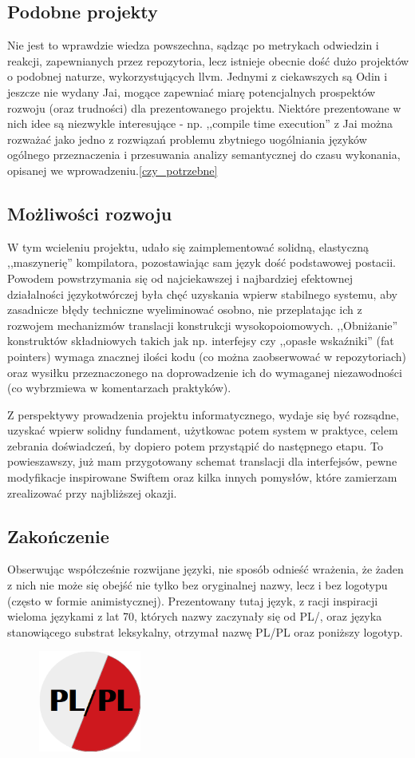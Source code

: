 \subsection{Podobne projekty}
Nie jest to wprawdzie wiedza powszechna, sądząc po metrykach odwiedzin i reakcji, zapewnianych przez repozytoria, lecz istnieje obecnie dość dużo projektów o podobnej naturze, wykorzystujących llvm. Jednymi z ciekawszych są Odin\cite{Odin} i jeszcze nie wydany Jai\cite{Jai}, mogące zapewniać miarę potencjalnych prospektów rozwoju (oraz trudności) dla prezentowanego projektu. Niektóre prezentowane w nich idee są niezwykle interesujące - np. ,,compile time execution'' z Jai można rozważać jako jedno z rozwiązań problemu zbytniego uogólniania języków ogólnego przeznaczenia i przesuwania analizy semantycznej do czasu wykonania, opisanej we wprowadzeniu.\ref{czy_potrzebne}

\subsection{Możliwości rozwoju}
W tym wcieleniu projektu, udało się zaimplementować solidną, elastyczną ,,maszynerię'' kompilatora, pozostawiając sam język dość podstawowej postacii. Powodem powstrzymania się od najciekawszej i najbardziej efektownej działalności językotwórczej była chęć uzyskania wpierw stabilnego systemu, aby zasadnicze błędy techniczne wyeliminować osobno, nie przeplatając ich z rozwojem mechanizmów translacji konstrukcji wysokopoiomowych. ,,Obniżanie'' konstruktów składniowych takich jak np. interfejsy czy ,,opasłe wskaźniki'' (fat pointers) wymaga znacznej ilości kodu (co można zaobserwować w repozytoriach) oraz wysiłku przeznaczonego na doprowadzenie ich do wymaganej niezawodności (co wybrzmiewa w komentarzach praktyków).

Z perspektywy prowadzenia projektu informatycznego, wydaje się być rozsądne, uzyskać wpierw solidny fundament, użytkowac potem system w praktyce, celem zebrania doświadczeń, by dopiero potem przystąpić do następnego etapu. To powieszawszy, już mam przygotowany schemat translacji dla interfejsów, pewne modyfikacje inspirowane Swiftem oraz kilka innych pomysłów, które zamierzam zrealizować przy najbliższej okazji.

\subsection{Zakończenie}
Obserwując współcześnie rozwijane języki, nie sposób odnieść wrażenia, że żaden z nich nie może się obejść nie tylko bez oryginalnej nazwy, lecz i bez logotypu (często w formie animistycznej). Prezentowany tutaj język, z racji inspiracji wieloma językami z lat 70, których nazwy zaczynały się od PL/, oraz języka stanowiącego substrat leksykalny, otrzymał nazwę PL/PL oraz poniższy logotyp.

\begin{figure}[h]
    \centering
    \includegraphics[width=0.3\textwidth]{images/znaczek.png}
\end{figure}
